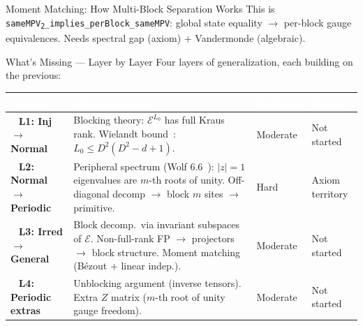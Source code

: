 \documentclass[aspectratio=169,10pt]{beamer}
\begin{document}
\begin{frame}{Moment Matching: How Multi-Block Separation Works}
    \vspace{0.05em}
    {\scriptsize\textcolor{dimwhite}{%
    This is \texttt{sameMPV\textsubscript{2}\_implies\_perBlock\_sameMPV}:
    global state equality $\to$ per-block gauge equivalences.
    Needs spectral gap (axiom) + Vandermonde (algebraic).}}
\end{frame}

\begin{frame}{What's Missing --- Layer by Layer}
    \vspace{-0.8em}
    {\small Four layers of generalization, each building on the previous:}

    \vspace{0.05em}
    \renewcommand{\arraystretch}{0.9}
    {\scriptsize
    \begin{tabular}{@{}>{\ \bfseries\color{white}}p{2.7cm}
                    p{5.8cm}
                    >{\centering\arraybackslash}p{1.4cm}
                    >{\centering\arraybackslash}p{1.4cm}@{}}
        \toprule
        \rowcolor{cardbg}
        \textcolor{white}{Layer} &
        \textcolor{white}{What's needed} &
        \textcolor{white}{Difficulty} &
        \textcolor{white}{Status} \\
        \midrule
        \rowcolor{cardbg}
        \textcolor{amber}{L1: Inj $\to$ Normal} &
        \textcolor{dimwhite}{Blocking theory: $\mathcal{E}^{L_0}$ has full Kraus rank.
        Wielandt bound~\cite{Sanz2010Quantum}: $L_0 \leq D^2(D^2-d+1)$.} &
        \textcolor{amber}{Moderate} &
        \textcolor{softred}{Not started} \\
        \rowcolor{cardbg}
        \textcolor{leanblue}{L2: Normal $\to$ Periodic} &
        \textcolor{dimwhite}{Peripheral spectrum (Wolf 6.6~\cite{Wolf2012Quantum}):
        $|z|{=}1$ eigenvalues are $m$-th roots of unity.
        Off-diagonal decomp $\to$ block $m$ sites $\to$ primitive.} &
        \textcolor{softred}{Hard} &
        \textcolor{softred}{Axiom territory} \\
        \rowcolor{cardbg}
        \textcolor{leangreen}{L3: Irred $\to$ General} &
        \textcolor{dimwhite}{Block decomp.\ via invariant subspaces of $\mathcal{E}$.
        Non-full-rank FP $\to$ projectors $\to$ block structure.
        Moment matching (B\'ezout + linear indep.).} &
        \textcolor{amber}{Moderate} &
        \textcolor{softred}{Not started} \\
        \rowcolor{cardbg}
        \textcolor{mintgreen}{L4: Periodic extras} &
        \textcolor{dimwhite}{Unblocking argument (inverse tensors).
        Extra $Z$ matrix ($m$-th root of unity gauge freedom).} &
        \textcolor{amber}{Moderate} &
        \textcolor{softred}{Not started} \\
        \bottomrule
    \end{tabular}
    }


\end{frame}
\end{document}
